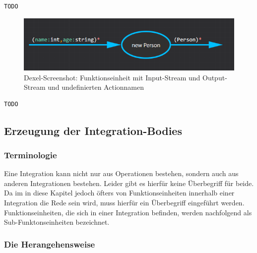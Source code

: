 	

	
	
	\begin{lstlisting}[caption=Mit Dexel generierter Code ]
	TODO
	\end{lstlisting}
	
			
			\begin{figure}[H]
				\centering
				\includegraphics[width=.9\linewidth]{./img/roslyn_StreamStream.png} 
				\caption{Dexel-Screenshot: Funktionseinheit mit Input-Stream und Output-Stream und undefinierten Actionnamen}
			\end{figure}
			

	\begin{lstlisting}[caption=Mit Dexel generierter Code ]
	TODO
	\end{lstlisting}
	 

\subsection{Erzeugung der Integration-Bodies}
\label{sec:orgheadline51}


	 \subsubsection{Terminologie}

	Eine Integration kann nicht nur aus
	Operationen bestehen, sondern auch aus anderen Integrationen bestehen.
	Leider gibt es hierfür keine Überbegriff für beide.
	Da im in diese Kapitel jedoch öfters von Funktionseinheiten innerhalb einer
	Integration die Rede sein wird, muss hierfür ein Überbegriff eingeführt
	werden. Funktionseinheiten, die sich in einer Integration befinden, werden
	nachfolgend als Sub-Funktonseinheiten bezeichnet.
	
	\subsubsection{Die Herangehensweise}

